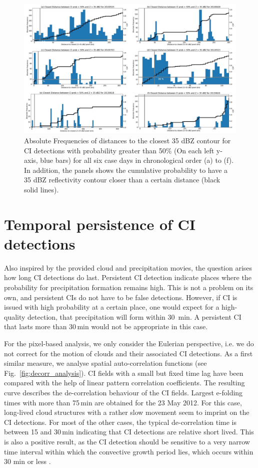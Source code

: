 \begin{figure}
\centering
\includegraphics[width=\textwidth]{Grafiken/Abbildungen/distance_CI50_RX35.jpg}
\caption{Absolute Frequencies of distances to the closest 35 dBZ contour for CI detections with probability greater than 50\% (On each left y-axis, blue bars) for all six case days in chronological order (a) to (f). In addition, the panels shows the cumulative probability to have a 35 dBZ reflectivity contour closer than a certain distance (black solid lines).}
\label{fig:distance_CI50-RX35}
\end{figure}

\section{Temporal persistence of CI detections}
Also inspired by the provided cloud and precipitation movies, the question arises how long CI detections do last. Persistent CI detection indicate places where the probability for precipitation formation remains high. This is not  a problem on its own, and persistent CIs do not have to be false detections. However, if CI is issued with high probability at a certain place, one would expect for a high-quality detection, that precipitation will form within 30~min. A persistent CI that lasts more than 30\,min would not be appropriate in this case.

For the pixel-based analysis, we only consider the Eulerian perspective, i.e. we do not correct for the motion of clouds and their associated CI detections. As a first similar measure, we analyse spatial auto-correlation functions (see Fig.~\ref{fig:decorr_analysis}). CI fields with a small but fixed time lag have been compared with the help of linear pattern correlation coefficients. The resulting curve describes the de-correlation behaviour of the CI fields. Largest e-folding times with more than 75\,min are obtained for the 23 May 2012. For this case, long-lived cloud structures with a rather slow movement seem to imprint on the CI detections. For most of the other cases, the typical de-correlation time is between 15 and 30\,min indicating that CI detections are relative short lived. This is also a positive result, as the CI detection should be sensitive to a very narrow time interval within which the convective growth period lies, which occurs within 30 min or less \citep{Senf.Deneke_2017_JAMC}. 

